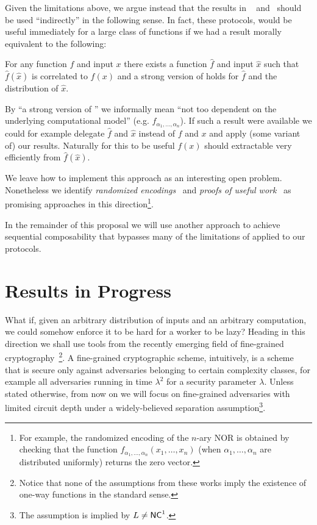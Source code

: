 Given the limitations above, we argue instead that the results in ~\cite{cg15} and~\cite{cg17} should be used ``indirectly'' in the following sense. In fact, these protocols, would be useful immediately for a large class of functions if we had a result morally equivalent to the following:
\begin{displayquote}
For any function $f$ and input $x$ there exists a function $\hat{f}$ and input $\hat{x}$ such that  $\hat{f}(\hat{x})$ is correlated to $f(x)$ and a strong version of \NoFLAVA  holds for $\hat{f}$ and the distribution of $\hat{x}$.
\end{displayquote}
By ``a strong version of \NoFLAVA'' we informally mean ``not too dependent on the underlying computational model'' (e.g. $f_{\alpha_1,\dots,\alpha_n}$).
If such a result were available we could for example delegate $\hat{f}$ and $\hat{x}$ instead of $f$ and $x$ and apply (some variant of) our results.
Naturally for this to be useful $f(x)$ should extractable very efficiently from $\hat{f}(\hat{x})$.

We leave how to implement this approach as an interesting open problem. Nonetheless we identify \textit{randomized encodings}~\cite{re} and \textit{proofs of useful work}~\cite{ball2017proofs}
as promising approaches in this direction\footnote{For example, the randomized encoding of the $n$-ary NOR is obtained by checking that the function $f_{\alpha_1,\dots,\alpha_n}(x_1,\dots,x_n)$ (when $\alpha_1,\dots,\alpha_n$ are distributed uniformly) returns the zero vector.}.

In the remainder of this proposal we  will use another approach to achieve sequential composability that bypasses many of the limitations of \NoFLAVA applied to our protocols.

\section{Results in Progress}

What if, given an arbitrary distribution of inputs and an arbitrary computation, we could somehow enforce it to be hard for a worker to be lazy? Heading in this direction we shall use tools from the recently emerging field of fine-grained cryptography~\cite{fgcrypto}\footnote{Notice that none of the assumptions from these works imply the existence of one-way functions in the standard sense.}. A fine-grained cryptographic scheme, intuitively, is a scheme that is secure only against adversaries belonging to certain complexity classes, for example all adversaries running in time $\lambda^2$ for a security parameter $\lambda$. Unless stated otherwise, from now on we will focus on fine-grained adversaries with limited circuit depth under a widely-believed separation assumption\footnote{The assumption is implied by $L \not = {\mathsf{NC}}^1$.}.

